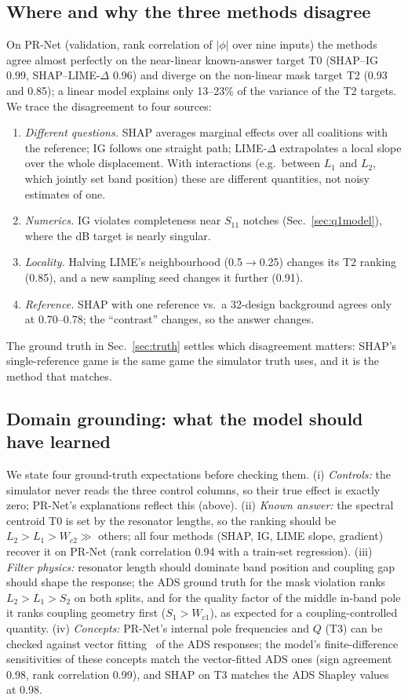 \documentclass[conference,onecolumn,10pt]{IEEEtran}
\newcommand{\lime}{LIME-$\Delta$}
\begin{document}
\subsection{Where and why the three methods disagree}
\label{sec:disagree}
On PR-Net (validation, rank correlation of $|\phi|$ over nine inputs) the methods agree almost perfectly on the near-linear known-answer target T0 (SHAP--IG 0.99, SHAP--\lime{} 0.96) and diverge on the non-linear mask target T2 (0.93 and 0.85); a linear model explains only 13--23\% of the variance of the T2 targets.
We trace the disagreement to four sources:
\begin{enumerate}
\item \emph{Different questions.} SHAP averages marginal effects over all coalitions with the reference; IG follows one straight path; \lime{} extrapolates a local slope over the whole displacement. With interactions (e.g.\ between $L_1$ and $L_2$, which jointly set band position) these are different quantities, not noisy estimates of one.
\item \emph{Numerics.} IG violates completeness near $S_{11}$ notches (Sec.~\ref{sec:q1model}), where the dB target is nearly singular.
\item \emph{Locality.} Halving LIME's neighbourhood (0.5$\to$0.25) changes its T2 ranking (0.85), and a new sampling seed changes it further (0.91).
\item \emph{Reference.} SHAP with one reference vs.\ a 32-design background agrees only at 0.70--0.78; the ``contrast'' changes, so the answer changes.
\end{enumerate}
The ground truth in Sec.~\ref{sec:truth} settles which disagreement matters: SHAP's single-reference game is the same game the simulator truth uses, and it is the method that matches.

\subsection{Domain grounding: what the model should have learned}
\label{sec:ground}
We state four ground-truth expectations before checking them.
(i) \emph{Controls:} the simulator never reads the three control columns, so their true effect is exactly zero; PR-Net's explanations reflect this (above).
(ii) \emph{Known answer:} the spectral centroid T0 is set by the resonator lengths, so the ranking should be $L_2>L_1>W_{c2}\gg$ others; all four methods (SHAP, IG, LIME slope, gradient) recover it on PR-Net (rank correlation 0.94 with a train-set regression).
(iii) \emph{Filter physics:} resonator length should dominate band position and coupling gap should shape the response; the ADS ground truth for the mask violation ranks $L_2>L_1>S_2$ on both splits, and for the quality factor of the middle in-band pole it ranks coupling geometry first ($S_1>W_{c1}$), as expected for a coupling-controlled quantity.
(iv) \emph{Concepts:} PR-Net's internal pole frequencies and $Q$ (T3) can be checked against vector fitting~\cite{gustavsen1999} of the ADS responses; the model's finite-difference sensitivities of these concepts match the vector-fitted ADS ones (sign agreement 0.98, rank correlation 0.99), and SHAP on T3 matches the ADS Shapley values at 0.98.
\end{document}
